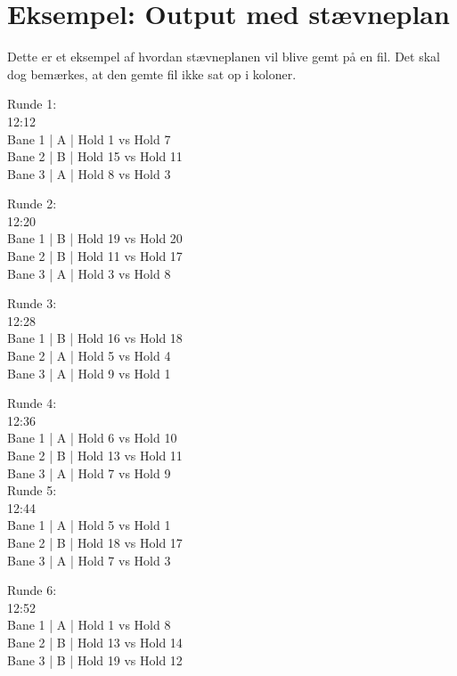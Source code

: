 \chapter{Eksempel: Output med stævneplan}\label{ch:appHlabel}

Dette er et eksempel af hvordan stævneplanen vil blive gemt på en fil. Det skal dog bemærkes, at den gemte fil ikke sat op i koloner.

\begin{multicols}{2}
Runde 1:\\
12:12\\
Bane  1 | A | Hold 1 vs Hold 7\\
Bane  2 | B | Hold 15 vs Hold 11\\
Bane  3 | A | Hold 8 vs Hold 3\\
\par
Runde 2:\\
12:20\\
Bane  1 | B | Hold 19 vs Hold 20\\
Bane  2 | B | Hold 11 vs Hold 17\\
Bane  3 | A | Hold 3 vs Hold 8\\
\par
Runde 3:\\
12:28\\
Bane  1 | B | Hold 16 vs Hold 18\\
Bane  2 | A | Hold 5 vs Hold 4\\
Bane  3 | A | Hold 9 vs Hold 1\\
\par
Runde 4:\\
12:36\\
Bane  1 | A | Hold 6 vs Hold 10\\
Bane  2 | B | Hold 13 vs Hold 11\\
Bane  3 | A | Hold 7 vs Hold 9\\
Runde 5:\\
12:44\\
Bane  1 | A | Hold 5 vs Hold 1\\
Bane  2 | B | Hold 18 vs Hold 17\\
Bane  3 | A | Hold 7 vs Hold 3\\
\par
Runde 6:\\
12:52\\
Bane  1 | A | Hold 1 vs Hold 8\\
Bane  2 | B | Hold 13 vs Hold 14\\
Bane  3 | B | Hold 19 vs Hold 12\\

\end{multicols}
